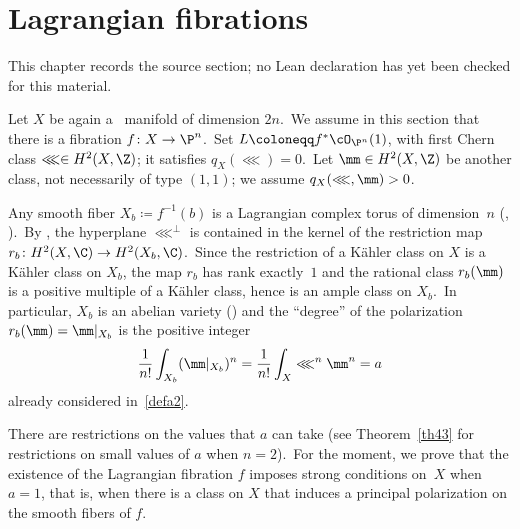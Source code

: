 \chapter{Lagrangian fibrations}
\label{riemann-roch-polynomials-hyperkahler-fourfolds-chapter-03}

\begin{remark}
\label{riemann-roch-polynomials-hyperkahler-fourfolds-chapter-03-source}
This chapter records the source section; no Lean declaration has yet been checked for this material.
\notready
\end{remark}

\label{sec:LagrangianFibration}


Let $X$ be again a \hk\ manifold of dimension $2n$.\
We assume in this section that there is a  fibration $f\colon X\to \P^n$.\
Set $L\coloneqq f^*\cO_{\P^n}(1)$, with first Chern class $\lll\in H^2(X,\Z)$; it satisfies \mbox{$q_X(\lll)=0$.}\
Let $\mm\in H^2(X,\Z)$ be another class, not necessarily of type $(1,1)$; we assume \mbox{$q_X(  \lll, \mm)>0$.}

Any smooth fiber $X_b\coloneqq f^{-1}(b)$ is a Lagrangian complex torus  of dimension~$n$ (\cite[Theorem~1]{mat}, \cite[Theorem 1]{ac}).\
By \cite[Lemma~2.2]{matlag}, the hyperplane $\lll^\bot$ is contained in the kernel of the  restriction map $r_b\colon H^2(X,\C)\to H^2(X_b,\C)$.\
Since the restriction of a K\"ahler class on $X$ is a K\"ahler class on $X_b$, the map $r_b$ has rank exactly~$1$ and the rational class $r_b(\mm)$ is  a positive multiple of a K\"ahler class, hence is an ample class on $X_b$.\
In particular, $X_b$ is an abelian variety (\cite[Proposition~4]{ac}) and the ``degree'' of the polarization $r_b(\mm)=\mm\vert_{X_b}$ is the positive integer
\begin{equation*}
  \frac{1}{n!}\int_{X_b}(\mm\vert_{X_b})^{n}= \frac{1}{n!}\int_X \lll^{n}\mm^{n}=a
\end{equation*}
already considered in~\eqref{defa2}.



There are restrictions on the values that $a$ can take (see Theorem~\ref{th43}   for restrictions on small values of $a$ when $n=2$).\
For the moment, we prove that the existence of the Lagrangian fibration $f$ imposes strong conditions on~$X$ when~$a=1$, that is, when there is a class on $X$ that induces a principal polarization on the smooth fibers of $f$.

